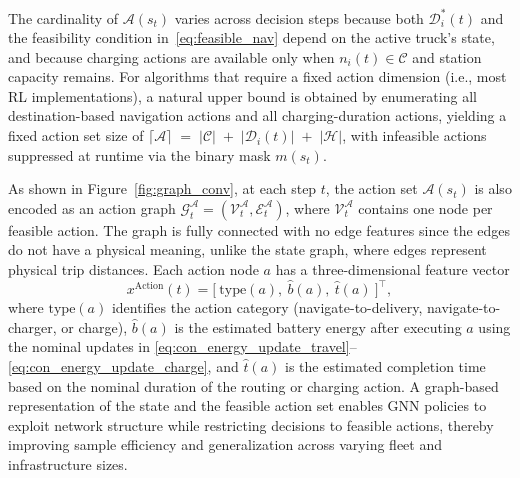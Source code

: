 \documentclass[a4paper,fleqn]{cas-sc}
\begin{document}
The cardinality of $\mathcal{A}(s_t)$ varies across decision steps because both $\mathcal{D}^{*}_{i}(t)$ and the feasibility condition in~\eqref{eq:feasible_nav} depend on the active truck's state, and because charging actions are available only when $n_i(t)\in\mathcal{C}$ and station capacity remains.
For algorithms that require a fixed action dimension (i.e., most RL implementations), a natural upper bound is obtained by enumerating all destination-based navigation actions and all charging-duration actions, yielding a fixed action set size of
$ \lceil\mathcal{A}\rceil \;=\;|\mathcal{C}| \;+\; |\mathcal{D}_{i}(t)| \;+\; |\mathcal{H}|$,
with infeasible actions suppressed at runtime via the binary mask $m(s_t)$.

As shown in Figure~\ref{fig:graph_conv}, at each step $t$, the action set $\mathcal{A}(s_t)$ is also encoded as an action graph $\mathcal{G}^{\mathcal{A}}_t=(\mathcal{V}^{\mathcal{A}}_t,\mathcal{E}^{\mathcal{A}}_t)$,
where $\mathcal{V}^{\mathcal{A}}_t$ contains one node per feasible action. The graph is fully connected with no edge features since the edges do not have a physical meaning, unlike the state graph, where edges represent physical trip distances. 
Each action node $a$ has a three-dimensional feature vector
\begin{equation}
x^{\text{Action}}(t)=\big[\ \mathrm{type}(a),\ \widehat{b}(a),\ \widehat{t}(a)\ \big]^\top,
\label{eq:action_node_features}
\end{equation}
where $\mathrm{type}(a)$ identifies the action category (navigate-to-delivery, navigate-to-charger, or charge),
$\widehat{b}(a)$ is the estimated battery energy after executing $a$ using the nominal updates in \eqref{eq:con_energy_update_travel}--\eqref{eq:con_energy_update_charge}, and
$\widehat{t}(a)$ is the estimated completion time based on the nominal duration of the routing or charging action. 
A graph-based representation of the state and the feasible action set enables GNN policies to exploit network structure while restricting decisions to feasible actions, thereby improving sample efficiency and generalization across varying fleet and infrastructure sizes.
\end{document}
